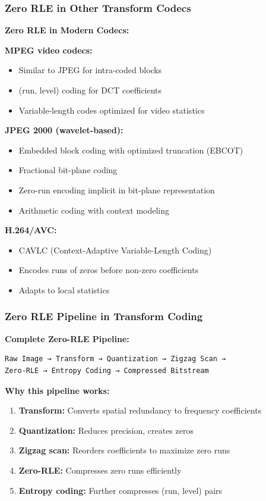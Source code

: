 \subsubsection{Zero RLE in Other Transform Codecs}

\begin{importantbox}
\textbf{Zero RLE in Modern Codecs:}

\textbf{MPEG video codecs:}
\begin{itemize}
    \item Similar to JPEG for intra-coded blocks
    \item (run, level) coding for DCT coefficients
    \item Variable-length codes optimized for video statistics
\end{itemize}

\textbf{JPEG 2000 (wavelet-based):}
\begin{itemize}
    \item Embedded block coding with optimized truncation (EBCOT)
    \item Fractional bit-plane coding
    \item Zero-run encoding implicit in bit-plane representation
    \item Arithmetic coding with context modeling
\end{itemize}

\textbf{H.264/AVC:}
\begin{itemize}
    \item CAVLC (Context-Adaptive Variable-Length Coding)
    \item Encodes runs of zeros before non-zero coefficients
    \item Adapts to local statistics
\end{itemize}
\end{importantbox}

\subsubsection{Zero RLE Pipeline in Transform Coding}

\begin{importantbox}
\textbf{Complete Zero-RLE Pipeline:}

\begin{verbatim}
Raw Image → Transform → Quantization → Zigzag Scan → 
Zero-RLE → Entropy Coding → Compressed Bitstream
\end{verbatim}

\textbf{Why this pipeline works:}
\begin{enumerate}
    \item \textbf{Transform:} Converts spatial redundancy to frequency coefficients
    \item \textbf{Quantization:} Reduces precision, creates zeros
    \item \textbf{Zigzag scan:} Reorders coefficients to maximize zero runs
    \item \textbf{Zero-RLE:} Compresses zero runs efficiently
    \item \textbf{Entropy coding:} Further compresses (run, level) pairs
\end{enumerate}
\end{importantbox}


